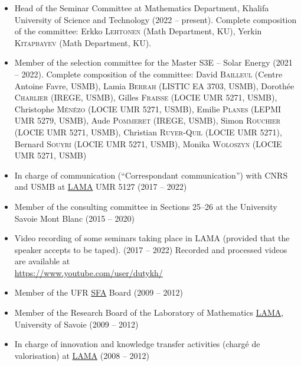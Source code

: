 \documentclass[final, a4paper, oneside, 12pt]{article}
\numberwithin{equation}{section}
\begin{document}
\begin{itemize}

  \item Head of the Seminar Committee at Mathematics Department, Khalifa University of Science and Technology (2022 -- present). Complete composition of the committee: Erkko \textsc{Lehtonen} (Math Department, KU), Yerkin \textsc{Kitapbayev} (Math Department, KU).

  \item Member of the selection committee for the Master S3E -- Solar Energy (2021 -- 2022). Complete composition of the committee: David \textsc{Bailleul} (Centre Antoine Favre, USMB), Lamia \textsc{Berrah} (LISTIC EA 3703, USMB), Doroth\'ee \textsc{Charlier} (IREGE, USMB), Gilles \textsc{Fraisse} (LOCIE UMR 5271, USMB), Christophe \textsc{M\'en\'ezo} (LOCIE UMR 5271, USMB), Emilie \textsc{Planes} (LEPMI UMR 5279, USMB), Aude \textsc{Pommeret} (IREGE, USMB), Simon \textsc{Rouchier} (LOCIE UMR 5271, USMB), Christian \textsc{Ruyer-Quil} (LOCIE UMR 5271), Bernard \textsc{Souyri} (LOCIE UMR 5271, USMB), Monika \textsc{Woloszyn} (LOCIE UMR 5271, USMB)
 
  \item In charge of communication (``Correspondant communication'') with CNRS and USMB at \href{https://www.lama.univ-savoie.fr}{LAMA} UMR 5127 (2017 -- 2022)

  \item Member of the consulting committee in Sections 25--26 at the University Savoie Mont Blanc (2015 -- 2020)
  
  \item Video recording of some seminars taking place in LAMA (provided that the speaker accepts to be taped). (2017 -- 2022) Recorded and processed videos are available at \\
  \url{https://www.youtube.com/user/dutykh/}
	
  \item Member of the UFR \href{https://www.sfa.univ-savoie.fr/}{SFA} Board (2009 -- 2012)

  \item Member of the Research Board of the Laboratory of Mathematics \href{https://www.lama.univ-savoie.fr}{LAMA}, University of Savoie (2009 -- 2012)
  
  \item In charge of innovation and knowledge transfer activities (charg\'e de valorisation) at \href{http://www.lama.univ-savoie.fr}{LAMA} (2008 -- 2012)
  

\end{itemize}
\end{document}
